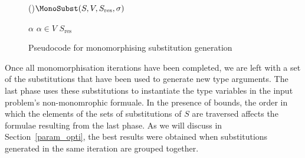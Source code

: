 \documentclass[runningheads]{llncs}
\begin{document}
\begin{figure}[t]
   \begin{algorithm}[H]


   \Fn(){\(\MonoSubst(S, V, S_{\text{res}}, \sigma)\)}{


   \BlankLine

   \eIf{\(V = \emptyset\)}{
    \Return \(S_{\text{res}}\cup\{\sigma\}\)\;%
   }
   {
      \Let \(\alpha \) \ST \(\alpha\in V\)\;
      \Return \(S_{\text{res}}\)\;
   }
   }


\end{algorithm}
\caption{Pseudocode for monomorphising substitution generation}
\label{mono_substs}
\end{figure}

Once all monomorphisation iterations have been completed, we are left with a set of the substitutions that have been used to generate new type arguments. The last phase uses these substitutions to instantiate the type variables in the input problem's non-monomrophic formuale. In the presence of bounds, the order in which the elements of the sets of substitutions of \(S\) are traversed affects the formulae resulting from the last phase. As we will discuss in Section~\ref{param_opti}, the best results were obtained when substitutions generated in the same iteration are grouped together.
\end{document}
